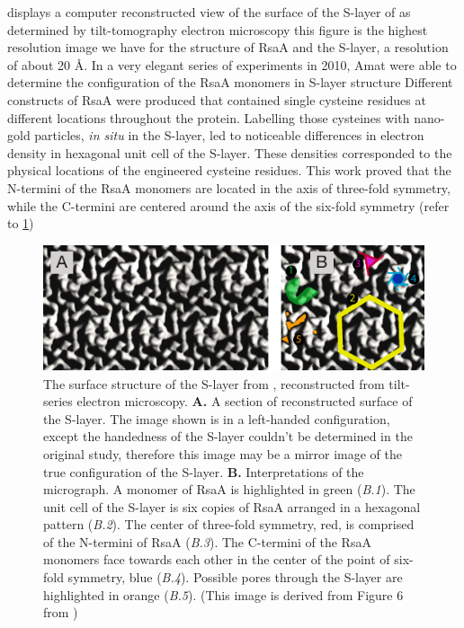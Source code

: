  displays a computer reconstructed view of the surface of the \ac{S-layer} of \caulobacter as determined by tilt-tomography electron microscopy this figure is the highest resolution image we have for the structure of RsaA and the \ac{S-layer}, a resolution of about 20 \AA{}. 
In a very elegant series of experiments in 2010, Amat \etal were able to determine the configuration of the RsaA monomers in \ac{S-layer} structure Different constructs of RsaA were produced that contained single cysteine residues at different locations throughout the protein.  Labelling those cysteines with nano-gold particles, \textit{in situ} in the \ac{S-layer}, led to noticeable differences in electron density in hexagonal unit cell of the \ac{S-layer}. These densities corresponded to the physical locations of the engineered cysteine residues. This work proved that the N-termini of the RsaA monomers are  located in the axis of three-fold symmetry, while the C-termini are centered around the axis of the six-fold symmetry (refer to \cref{fig:intro-micrograph})

\begin{figure}[htb]
  \begin{center}
    \includegraphics[width=\textwidth]{intro/img/slayermicrograph.pdf}
  \end{center}
  \caption[Reconstructed surface of the \caulobacter \ac{S-layer}]{
    The surface structure of the \ac{S-layer} from \caulobacter, reconstructed from tilt-series electron microscopy. \textbf{A.} A section of reconstructed surface of the \caulobacter \ac{S-layer}. The image shown is in a left-handed configuration, except the handedness of the \ac{S-layer} couldn't be determined in the original study, therefore this image may be a mirror image of the true configuration of the \ac{S-layer}. \textbf{B.} Interpretations of the micrograph.  A monomer of RsaA is highlighted in green (\textit{B.1}).  The unit cell of the \ac{S-layer} is six copies of RsaA arranged in a hexagonal pattern (\textit{B.2}).  The center of three-fold symmetry, red, is comprised of the N-termini of RsaA (\textit{B.3}).  The C-termini of the RsaA monomers face towards each other in the center of the point of six-fold symmetry, blue (\textit{B.4}). Possible pores through the \ac{S-layer} are highlighted in orange (\textit{B.5}). (This image is derived from Figure 6 from )
  }
  \label{fig:intro-micrograph}
\end{figure}   

